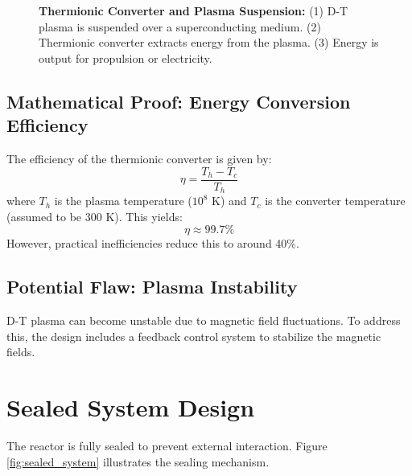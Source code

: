 \documentclass[12pt, a4paper]{article}
\begin{document}
\begin{figure}[H]
\centering
{}
\caption{
\textbf{Thermionic Converter and Plasma Suspension:} 
(1) D-T plasma is suspended over a superconducting medium. 
(2) Thermionic converter extracts energy from the plasma. 
(3) Energy is output for propulsion or electricity.
}
\label{fig:thermionic_converter}
\end{figure}

\subsection{Mathematical Proof: Energy Conversion Efficiency}
The efficiency of the thermionic converter is given by:
\[
\eta = \frac{T_h - T_c}{T_h}
\]
where \( T_h \) is the plasma temperature ($10^8$ K) and \( T_c \) is the converter temperature (assumed to be 300 K). This yields:
\[
\eta \approx 99.7\%
\]
However, practical inefficiencies reduce this to around 40\%.

\subsection{Potential Flaw: Plasma Instability}
D-T plasma can become unstable due to magnetic field fluctuations. To address this, the design includes a feedback control system to stabilize the magnetic fields.

\section{Sealed System Design}
The reactor is fully sealed to prevent external interaction. Figure \ref{fig:sealed_system} illustrates the sealing mechanism.
\end{document}
